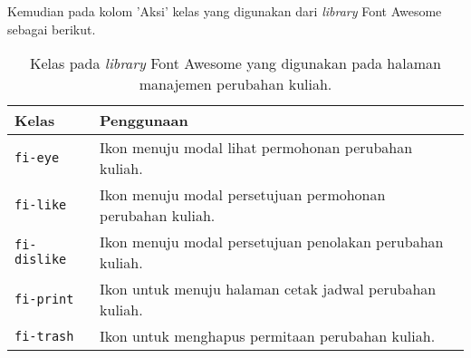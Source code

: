 Kemudian pada kolom 'Aksi' kelas yang digunakan dari \textit{library} Font Awesome sebagai berikut.
\begin{table}[H]
	\centering
	\begin{tabularx}{\textwidth}{lX}
		\toprule
		Kelas     & Penggunaan \\
		\midrule
		\texttt{fi-eye} & Ikon menuju modal lihat permohonan perubahan kuliah.\\
		\texttt{fi-like} & Ikon menuju modal persetujuan permohonan perubahan kuliah.\\
		\texttt{fi-dislike} & Ikon menuju modal persetujuan penolakan perubahan kuliah.\\
		\texttt{fi-print} & Ikon untuk menuju halaman cetak jadwal perubahan kuliah.\\
		\texttt{fi-trash} & Ikon untuk menghapus permitaan perubahan kuliah.\\
		\bottomrule
	\end{tabularx}%
	\caption{Kelas pada \textit{library} Font Awesome yang digunakan pada halaman manajemen perubahan kuliah.}
\end{table}

